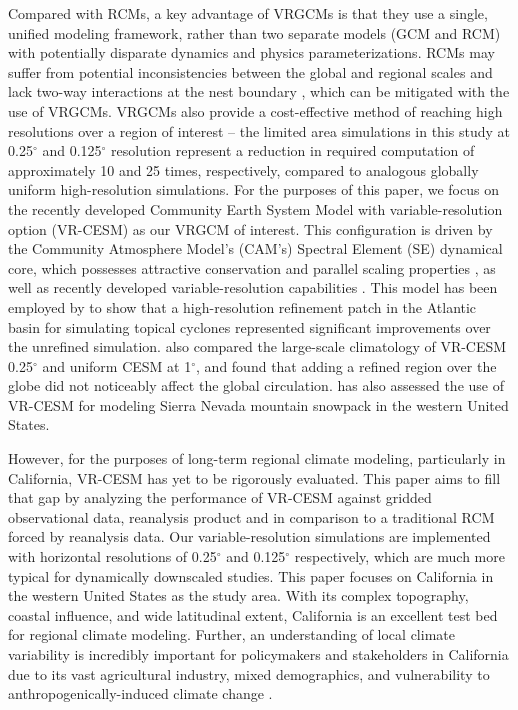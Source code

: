 \documentclass[draft,ms]{agutex}   %
\begin{document}
\begin{article}
Compared with RCMs, a key advantage of VRGCMs is that they use a single, unified modeling framework, rather than two separate models (GCM and RCM) with potentially disparate dynamics and physics parameterizations. RCMs may suffer from potential inconsistencies between the global and regional scales and lack two-way interactions at the nest boundary \citep{warner1997tutorial, mcdonald2003transparent, laprise2008challenging, mesinger2013limited}, which can be mitigated with the use of VRGCMs. VRGCMs also provide a cost-effective method of reaching high resolutions over a region of interest -- the limited area simulations in this study at 0.25$^\circ$ and 0.125$^\circ$ resolution represent a reduction in required computation of approximately 10 and 25 times, respectively, compared to analogous globally uniform high-resolution simulations. For the purposes of this paper, we focus on the recently developed Community Earth System Model with variable-resolution option (VR-CESM) as our VRGCM of interest. This configuration is driven by the Community Atmosphere Model's (CAM's) Spectral Element (SE) dynamical core, which possesses attractive conservation and parallel scaling properties \citep{dennis2011cam, taylor2011conservation}, as well as recently developed variable-resolution capabilities \citep{zarzycki2014aquaplanet, zarzycki2015experimental}. This model has been employed by \cite{zarzycki2014using} to show that a high-resolution refinement patch in the Atlantic basin for simulating topical cyclones represented significant improvements over the unrefined simulation. \cite{zarzycki2015effects} also compared the large-scale climatology of VR-CESM 0.25$^\circ$ and uniform CESM at 1$^\circ$, and found that adding a refined region over the globe did not noticeably affect the global circulation. \cite{Rhoades2015Characterizing} has also assessed the use of VR-CESM for modeling Sierra Nevada mountain snowpack in the western United States.


However, for the purposes of long-term regional climate modeling, particularly in California, VR-CESM has yet to be rigorously evaluated. This paper aims to fill that gap by analyzing the performance of VR-CESM against gridded observational data, reanalysis product and in comparison to a traditional RCM forced by reanalysis data. Our variable-resolution simulations are implemented with horizontal resolutions of 0.25$^\circ$ and 0.125$^\circ$ respectively, which are much more typical for dynamically downscaled studies. This paper focuses on California in the western United States as the study area. With its complex topography, coastal influence, and wide latitudinal extent, California is an excellent test bed for regional climate modeling. Further, an understanding of local climate variability is incredibly important for policymakers and stakeholders in California due to its vast agricultural industry, mixed demographics, and vulnerability to anthropogenically-induced climate change \citep{hayhoe2004emissions, cayan2008overview}. 



\end{article}
\end{document}
